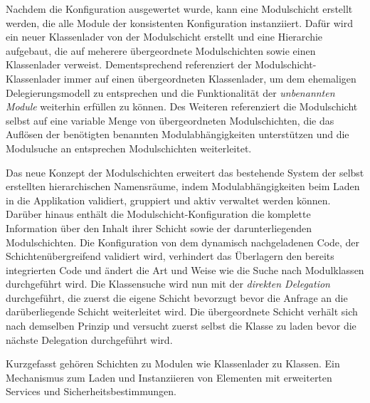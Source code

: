     Nachdem die Konfiguration ausgewertet wurde, kann eine Modulschicht erstellt werden, die alle Module der konsistenten Konfiguration instanziiert. Dafür wird ein neuer Klassenlader von der Modulschicht erstellt und eine Hierarchie aufgebaut, die auf meherere übergeordnete Modulschichten sowie einen Klassenlader verweist. Dementsprechend referenziert der Modulschicht-Klassenlader immer auf einen übergeordneten Klassenlader, um dem ehemaligen Delegierungsmodell zu entsprechen und die Funktionalität der \textit{unbenannten Module} weiterhin erfüllen zu können. Des Weiteren referenziert die Modulschicht selbst auf eine variable Menge von übergeordneten Modulschichten, die das Auflösen der benötigten benannten Modulabhängigkeiten unterstützen und die Modulsuche an entsprechen Modulschichten weiterleitet. \bigbreak

    Das neue Konzept der Modulschichten erweitert das bestehende System der selbst erstellten hierarchischen Namensräume, indem Modulabhängigkeiten beim Laden in die Applikation validiert, gruppiert und aktiv verwaltet werden können. Darüber hinaus enthält die Modulschicht-Konfiguration die komplette Information über den Inhalt ihrer Schicht sowie der darunterliegenden Modulschichten. \newline
    Die Konfiguration von dem dynamisch nachgeladenen Code, der Schichtenübergreifend validiert wird, verhindert das Überlagern den bereits integrierten Code und ändert die Art und Weise wie die Suche nach Modulklassen durchgeführt wird. \newline
    Die Klassensuche wird nun mit der \textit{direkten Delegation} durchgeführt, die zuerst die eigene Schicht bevorzugt bevor die Anfrage an die darüberliegende Schicht weiterleitet wird. Die übergeordnete Schicht verhält sich nach demselben Prinzip und versucht zuerst selbst die Klasse zu laden bevor die nächste Delegation durchgeführt wird. \bigbreak

    Kurzgefasst gehören Schichten zu Modulen wie Klassenlader zu Klassen. Ein Mechanismus zum Laden und Instanziieren von Elementen mit erweiterten Services und Sicherheitsbestimmungen.\cite{javaMod9,parentDelegationModel,modulMitJava9}


